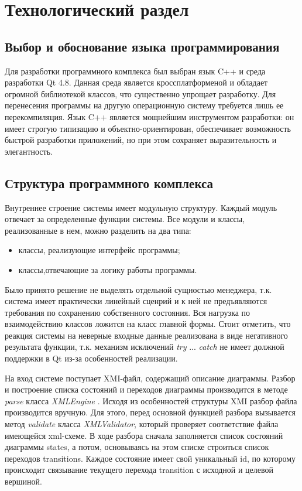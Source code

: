 \chapter{Технологический раздел}

\section{Выбор и обоснование языка программирования}

Для разработки программного комплекса был выбран язык C++ и среда разработки Qt 4.8. Данная среда является кроссплатформеной и обладает огромной библиотекой классов, что существенно упрощает разработку. Для перенесения программы на другую операционную систему требуется лишь ее перекомпиляция. Язык C++ является мощнейшим инструментом разработки: он имеет строгую типизацию и объектно-ориентирован, обеспечивает возможность быстрой разработки приложений, но при этом сохраняет выразительность и элегантность.

\section{Структура программного комплекса}

Внутреннее строение системы имеет модульную структуру. Каждый модуль отвечает за определенные функции системы. Все модули и классы, реализованные в нем, можно разделить на два типа:
\begin{itemize}
\item классы, реализующие интерфейс программы;
\item классы,отвечающие за логику работы программы.
\end{itemize}

Было принято решение не выделять отдельной сущностью менеджера, т.к. система имеет практически линейный сценрий и к ней не предъявляются требования по сохранению собственного состояния. Вся нагрузка по взаимодействию классов ложится на класс главной формы. Стоит отметить, что реакция системы на неверные входные данные реализована в виде негативного результата функции, т.к. механизм исключений \textit{try} ... \textit{catch} не имеет должной поддержки в Qt из-за особенностей реализации.

На вход системе поступает XMI-файл, содержащий описание диаграммы. Разбор и построение списка состояний и переходов диаграммы производится в методе \textit{parse} класса \textit{XMLEngine} . Исходя из особенностей структуры XMI разбор файла производится вручную. Для этого, перед основной функцией разбора вызывается метод \textit{validate} класса \textit{XMLValidator}, который проверяет соответствие файла имеющейся xml-схеме. В ходе разбора сначала заполняется список состояний диаграммы states, а потом, основываясь на этом списке строиться список переходов transitions. Каждое состояние имеет свой уникальный id, по которому происходит связывание текущего перехода transition с исходной и целевой вершиной.

